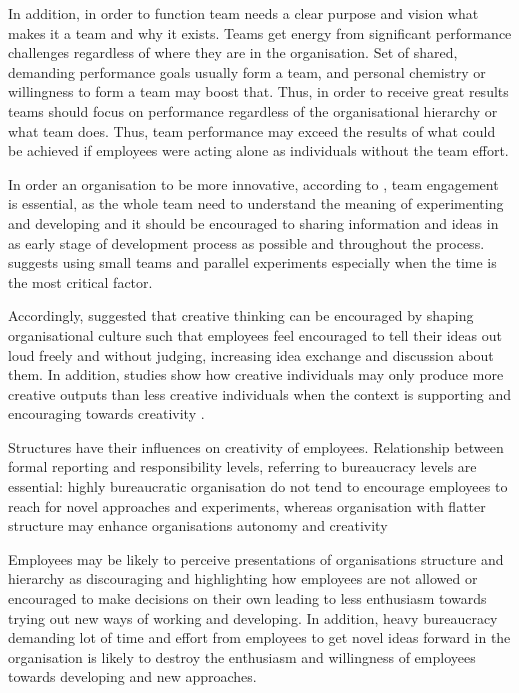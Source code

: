 In addition, in order to function team needs a clear purpose and vision what makes it a team and why it exists. Teams get energy from significant performance challenges regardless of where they are in the organisation. Set of shared, demanding performance goals usually form a team, and personal chemistry or willingness to form a team may boost that. Thus, in order to receive great results teams should focus on performance regardless of the organisational hierarchy or what team does. Thus, team performance may exceed the results of what could be achieved if employees were acting alone as individuals without the team effort. \citep{katzenbach1993wisdom}

In order an organisation to be more innovative, according to \citet{thomke2001enlightened}, team engagement is essential, as the whole team need to understand the meaning of experimenting and developing and it should be encouraged to sharing information and ideas in as early stage of development process as possible and throughout the process. \citet{thomke2001enlightened} suggests using small teams and parallel experiments especially when the time is the most critical factor. 

Accordingly, \citet{amabile1998kill} suggested that creative thinking can be encouraged by shaping organisational culture such that employees feel encouraged to tell their ideas out loud freely and without judging, increasing idea exchange and discussion about them. In addition, studies show how creative individuals may only produce more creative outputs than less creative individuals when the context is supporting and encouraging towards creativity \citep{oldham1996employee}. 

Structures have their influences on creativity of employees. Relationship between formal reporting and responsibility levels, referring to bureaucracy levels are essential: highly bureaucratic organisation do not tend to encourage employees to reach for novel approaches and experiments, whereas organisation with flatter structure may enhance organisations autonomy and creativity \citep{shalley2004leaders}

Employees may be likely to perceive presentations of organisations structure and hierarchy as discouraging and highlighting how employees are not allowed or encouraged to make decisions on their own leading to less enthusiasm towards trying out new ways of working and developing. In addition, heavy bureaucracy demanding lot of time and effort from employees to get novel ideas forward in the organisation is likely to destroy the enthusiasm and willingness of employees towards developing and new approaches. \citep{shalley2004leaders}



